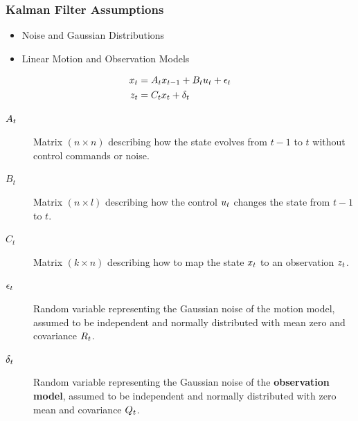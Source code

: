    
   \begin{frame}
    \frametitle{Kalman Filter Assumptions}
   \small
   \begin{itemize}
   \item Noise and Gaussian Distributions
   \item Linear Motion and Observation Models
   \end{itemize}
   
   \begin{align*}
   x_{t} &= A_{t} x_{t-1} + B_{t}u_{t} + \epsilon_{t}\\
   z_{t} &= C_{t} x_{t} + \delta_{t}
   \end{align*}
   
   \begin{description}
   \item[$A_{t}$] Matrix $(n \times n)$ describing how the state evolves from $t-1$ to $t$ without control commands or noise.
   
   \item[$B_{t}$] Matrix $(n \times l)$ describing how the control $u_{t}$ changes the state from $t-1$ to $t$.
   
   \item[$C_{t}$] Matrix $(k \times n)$ describing how to map the state $x_{t}$ to an observation $z_{t}$.
   
   \item[$\epsilon_{t}$] Random variable representing the Gaussian noise of the motion model, assumed to be independent and normally distributed with mean zero and covariance $R_{t}$.
   
   \item[$\delta_{t}$] Random variable representing the Gaussian noise of the {\bf observation model}, assumed to be independent and normally distributed with zero mean and covariance $Q_{t}$.
   
   \end{description}
   
   
   \end{frame}
   
